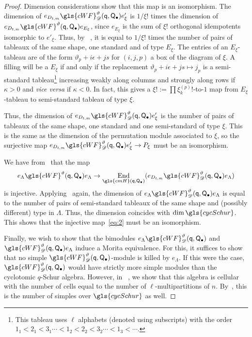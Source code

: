 \documentclass[10pt]{article}
\theoremstyle{definition}
\DeclareMathOperator{\End}{End}
\newcommand{\pq}{\mathsf{q}}
\newcommand{\PQ}{\mathsf{Q}}
\begin{document}
\begin{proof}
 Dimension considerations show that this map is an isomorphism. 
The dimension of $e_{D_{t,m}}\gls{cWF}^\vartheta_\mathscr{D}
 (\pq,\PQ_{\bullet}) e'_\xi$ is $1/\xi! $ times the
 dimension of $e_{D_{t,m}}\gls{cWF}^\vartheta
 (\pq,\PQ_{\bullet}) e_{E_\xi}$, since $e_{E_\xi}$ is the sum of
 $\xi! $ orthogonal idempotents isomorphic to $e'_\xi$. Thus, by
~\cite[Thm.~2.26]{WebRou}, it is equal to $1/\xi!$ times the
number of pairs of tableaux of the same shape, one standard and of
type $E_{\xi}$. 
 The entries of an $E_{\xi}$-tableau are of the form 
$\vartheta_p+i\epsilon+js$ for $(i,j,p)$ a box of the diagram of
$\xi$. A filling will be a $E_{\xi}$ if and only if the replacement
$\vartheta_p+i\epsilon+js\mapsto j_p$ is a semi-standard
tableau\footnote{This tableau uses $\ell$ alphabets (denoted using
 subscripts) with the order $1_1<2_1<3_1\cdots< 1_2<2_2<3_2\cdots<1_3<\cdots.$} increasing weakly along columns and strongly
 along rows if $\kappa>0$ and \emph{vice versa} if $\kappa<0$. In
 fact, this gives a $\xi!:=\prod \xi^{(p)}_k!$-to-$1$ map from
 $E_\xi$-tableau to semi-standard tableau of type $\xi$. 

Thus, the dimension of $e_{D_{t,m}}\gls{cWF}^\vartheta_\mathscr{D}
 (\pq,\PQ_{\bullet}) e'_\xi$ is the number of pairs of tableaux of
the same shape, one standard and one
semi-standard of type $\xi$. This is the same as the dimension of the
permutation module associated to $\xi$, so the surjective map $e_{D_{t,m}}\gls{cWF}^\vartheta_\mathscr{D}
 (\pq,\PQ_{\bullet}) e'_\xi\to P_{\xi}$ must be an isomorphism.

We have from~\cite[Lem.~3.3]{WebRou} that the map
\begin{equation}
e_\Lambda \gls{cWF}^\vartheta
 (\pq,\PQ_{\bullet})e_\Lambda \to \End_{\gls{cmH}(\pq,\PQ_\bullet)}(e_{D_{t,m}}\gls{cWF}^\vartheta_\mathscr{D}
 (\pq,\PQ_{\bullet}) e_\Lambda )\label{eq:2}
\end{equation}
is injective. Applying~\cite[Thm.~2.26]{WebRou} again, the
dimension of $e_\Lambda \gls{cWF}^\vartheta_\mathscr{D}
(\pq,\PQ_{\bullet})e_\Lambda $ is equal to the number of pairs of
semi-standard tableaux of the same shape and (possibly different) type
in $\Lambda$. Thus, the dimension coincides with $\dim
\gls{cycSchur}$. This shows that the injective map~\eqref{eq:2} must be
an isomorphism.

 Finally, we wish to show that the bimodules $e_\Lambda \gls{cWF}^\vartheta_\mathscr{D}
 (\pq,\PQ_{\bullet})$ and $\gls{cWF}^\vartheta_\mathscr{D}
 (\pq,\PQ_{\bullet})e_\Lambda $ induce a Morita equivalence. For this, it
 suffices to show that no simple $\gls{cWF}^\vartheta_\mathscr{D}
 (\pq,\PQ_{\bullet})$-module is killed by $e_\Lambda $. If this were the
 case, $\gls{cWF}^\vartheta_\mathscr{D}
 (\pq,\PQ_{\bullet})$ would have strictly more simple modules than the
 cyclotomic $q$-Schur algebra. However, in
~\cite[Thm.~2.26]{WebRou}, we show that this algebra is
 cellular with the number of cells equal to the number of
 $\ell$-multipartitions of $n$. By~\cite[6.16]{DJM}, this is the
 number of simples over $\gls{cycSchur}$ as well.
\end{proof}
\end{document}
